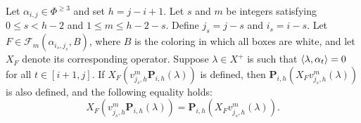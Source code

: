 \begin{lemma}\rm\label{conm. 2}
Let $\alpha_{i,j} \in \Phi^{\geq 3}$ and set $h = j-i+1$. 
Let $s$ and $m$ be integers satisfying $0 \leq s < h-2$ and $1 \leq m \leq h-2-s$. 
Define $j_s = j-s$ and $i_s = i-s$. 
Let $F \in \mathcal{F}_m(\alpha_{i_s,j_s},B)$, where $B$ is the coloring in which all boxes are white, and let $X_F$ denote its corresponding operator. 
Suppose $\lambda \in X^{+}$ is such that $\langle \lambda , \alpha_{t} \rangle = 0$ for all $t \in [i+1,j]$. 
If $X_F(v_{j_s,h}^m\mathbf{P}_{i,h}(\lambda))$ is defined, then $\mathbf{P}_{i,h}(X_F v_{j_s,h}^m(\lambda))$ is also defined, and the following equality holds:
\begin{equation}\label{eq: conm. 2}
    X_{F}(v_{j_s,h}^{m}\mathbf{P}_{i,h}(\lambda)) = \mathbf{P}_{i,h}(X_{F} v_{j_s,h}^m(\lambda)).
\end{equation}
\end{lemma}






